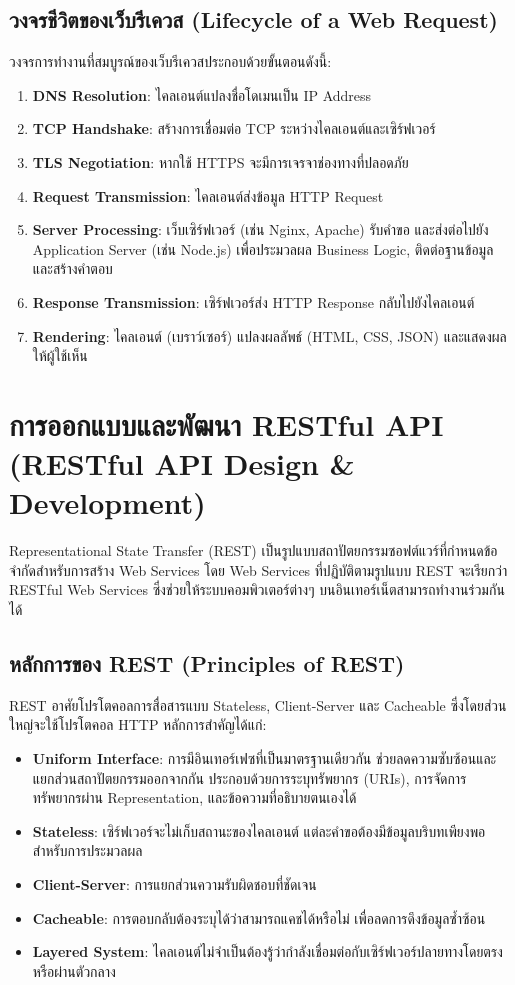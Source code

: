 \subsection{วงจรชีวิตของเว็บรีเควส (Lifecycle of a Web Request)}
วงจรการทำงานที่สมบูรณ์ของเว็บรีเควสประกอบด้วยขั้นตอนดังนี้:
\begin{enumerate}
    \item \textbf{DNS Resolution}: ไคลเอนต์แปลงชื่อโดเมนเป็น IP Address
    \item \textbf{TCP Handshake}: สร้างการเชื่อมต่อ TCP ระหว่างไคลเอนต์และเซิร์ฟเวอร์
    \item \textbf{TLS Negotiation}: หากใช้ HTTPS จะมีการเจรจาช่องทางที่ปลอดภัย
    \item \textbf{Request Transmission}: ไคลเอนต์ส่งข้อมูล HTTP Request
    \item \textbf{Server Processing}: เว็บเซิร์ฟเวอร์ (เช่น Nginx, Apache) รับคำขอ และส่งต่อไปยัง Application Server (เช่น Node.js) เพื่อประมวลผล Business Logic, ติดต่อฐานข้อมูล และสร้างคำตอบ
    \item \textbf{Response Transmission}: เซิร์ฟเวอร์ส่ง HTTP Response กลับไปยังไคลเอนต์
    \item \textbf{Rendering}: ไคลเอนต์ (เบราว์เซอร์) แปลงผลลัพธ์ (HTML, CSS, JSON) และแสดงผลให้ผู้ใช้เห็น
\end{enumerate}

\section{การออกแบบและพัฒนา RESTful API (RESTful API Design \& Development)}
Representational State Transfer (REST) เป็นรูปแบบสถาปัตยกรรมซอฟต์แวร์ที่กำหนดข้อจำกัดสำหรับการสร้าง Web Services โดย Web Services ที่ปฏิบัติตามรูปแบบ REST จะเรียกว่า RESTful Web Services ซึ่งช่วยให้ระบบคอมพิวเตอร์ต่างๆ บนอินเทอร์เน็ตสามารถทำงานร่วมกันได้

\subsection{หลักการของ REST (Principles of REST)}
REST อาศัยโปรโตคอลการสื่อสารแบบ Stateless, Client-Server และ Cacheable ซึ่งโดยส่วนใหญ่จะใช้โปรโตคอล HTTP หลักการสำคัญได้แก่:
\begin{itemize}
    \item \textbf{Uniform Interface}: การมีอินเทอร์เฟซที่เป็นมาตรฐานเดียวกัน ช่วยลดความซับซ้อนและแยกส่วนสถาปัตยกรรมออกจากกัน ประกอบด้วยการระบุทรัพยากร (URIs), การจัดการทรัพยากรผ่าน Representation, และข้อความที่อธิบายตนเองได้
    \item \textbf{Stateless}: เซิร์ฟเวอร์จะไม่เก็บสถานะของไคลเอนต์ แต่ละคำขอต้องมีข้อมูลบริบทเพียงพอสำหรับการประมวลผล
    \item \textbf{Client-Server}: การแยกส่วนความรับผิดชอบที่ชัดเจน
    \item \textbf{Cacheable}: การตอบกลับต้องระบุได้ว่าสามารถแคชได้หรือไม่ เพื่อลดการดึงข้อมูลซ้ำซ้อน
    \item \textbf{Layered System}: ไคลเอนต์ไม่จำเป็นต้องรู้ว่ากำลังเชื่อมต่อกับเซิร์ฟเวอร์ปลายทางโดยตรงหรือผ่านตัวกลาง
\end{itemize}

